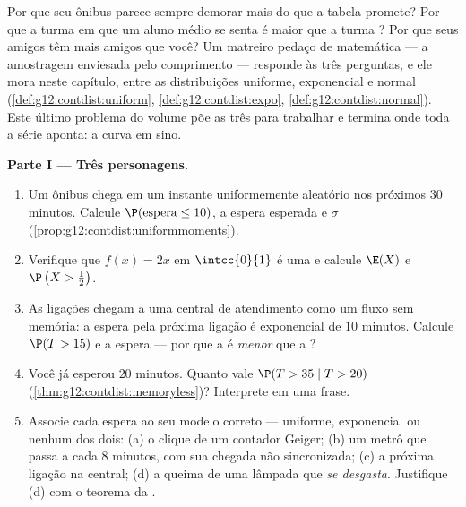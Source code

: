 \begin{problem}
\label{pb:g12:contdist:1}
Por que seu ônibus parece sempre demorar mais do que a tabela
promete? Por que a turma em que um aluno médio se senta é maior
que a turma ? Por que seus amigos têm mais amigos que você?
Um matreiro pedaço de matemática --- a amostragem enviesada pelo
comprimento --- responde às três perguntas, e ele mora neste
capítulo, entre as distribuições uniforme, exponencial e normal
(\cref{def:g12:contdist:uniform}, \cref{def:g12:contdist:expo},
\cref{def:g12:contdist:normal}). Este último problema do volume
põe as três  para trabalhar e termina onde toda a
série aponta: a curva em sino.

\medskip
\noindent\textbf{Parte I --- Três personagens.}
\begin{enumerate}
  \item Um ônibus chega em um instante uniformemente aleatório
        nos próximos $30$ minutos. Calcule
        $\P(\text{espera} \leq 10)$, a espera esperada e
        $\sigma$ (\cref{prop:g12:contdist:uniformmoments}).
  \item Verifique que $f(x) = 2x$ em $\intcc{0}{1}$ é uma
         e calcule $\E(X)$ e
        $\P\left(X > \frac12\right)$.
  \item As ligações chegam a uma central de atendimento como um
        fluxo sem memória: a espera pela próxima ligação é
        exponencial de  $10$ minutos. Calcule $\P(T > 15)$
        e a espera  --- por que a  é \emph{menor}
        que a ?
  \item Você já esperou $20$ minutos. Quanto vale
        $\P(T > 35 \mid T > 20)$
        (\cref{thm:g12:contdist:memoryless})? Interprete em uma
        frase.
  \item Associe cada espera ao seu modelo correto --- uniforme,
        exponencial ou nenhum dos dois: (a) o clique de um
        contador Geiger; (b) um metrô que passa a cada $8$
        minutos, com sua chegada não sincronizada; (c) a
        próxima ligação na central; (d) a queima de uma lâmpada
        que \emph{se desgasta}. Justifique (d) com o teorema da
        .
\end{enumerate}


\end{problem}
